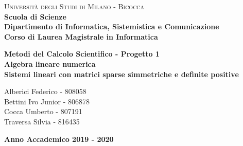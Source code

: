 \documentclass[a4paper,12pt]{article}
\renewcommand{\baselinestretch}{1.5}
\begin{document}
\begin{titlepage}
\noindent
    \vspace*{5mm}
	\begin{minipage}[t]{0.15\textwidth}
	    \vspace*{5mm}
	\end{minipage}
	\hspace{1cm}
	\begin{minipage}[t]{0.9\textwidth}
	      \vspace*{5mm}
		{
			{\textsc{Università degli Studi di Milano - Bicocca} } \\
			\textbf{Scuola di Scienze} \\
			\textbf{Dipartimento di Informatica, Sistemistica e Comunicazione} \\
			\textbf{Corso di Laurea Magistrale in Informatica} \\
			\par
		}
	\end{minipage}
	
	\vspace{42mm}

\begin{center}
    {\LARGE{
            \textbf{
            	Metodi del Calcolo Scientifico - Progetto 1 \\ 
            	Algebra lineare numerica \\ 
            	Sistemi lineari con matrici sparse simmetriche e deﬁnite positive}
    }}        
\end{center}

\vspace{40mm}
	
	
	\begin{flushright}
		\large{Alberici Federico - 808058\\} 
		\large{Bettini Ivo Junior - 806878\\} 
		\large{Cocca Umberto - 807191\\} 
		\large{Traversa Silvia - 816435} 
	\end{flushright}
	
	\vspace{15mm}
	\begin{center}
		{\large{\bf Anno Accademico 2019 - 2020}}
	\end{center}


\renewcommand{\baselinestretch}{1.5}

\end{titlepage}
\end{document}
